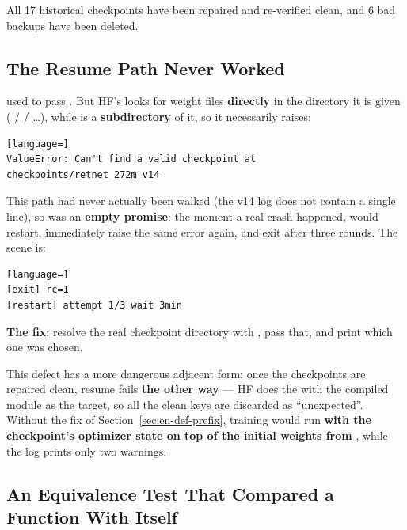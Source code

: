 All 17 historical checkpoints have been repaired and re-verified clean, and 6 bad backups have
been deleted.

\subsection{The Resume Path Never Worked}
\label{sec:en-def-resume}

 used to pass . But HF's
 looks for weight files \textbf{directly} in the
directory it is given ( /  / \dots), while
 is a \textbf{subdirectory} of it, so it necessarily raises:

\begin{lstlisting}[language=]
ValueError: Can't find a valid checkpoint at checkpoints/retnet_272m_v14
\end{lstlisting}

This path had never actually been walked (the v14 log does not contain a single
\code{[restart]} line), so  was an \textbf{empty promise}: the
moment a real crash happened,  would restart, immediately raise the same
error again, and exit after three rounds. The scene is:

\begin{lstlisting}[language=]
[exit] rc=1
[restart] attempt 1/3 wait 3min
\end{lstlisting}

\textbf{The fix}: resolve the real checkpoint directory with
, pass that, and print
which one was chosen.

\begin{notebox}
This defect has a more dangerous adjacent form: once the checkpoints are repaired clean, resume
fails \textbf{the other way} --- HF does the  with the compiled module
as the target, so all the clean keys are discarded as ``unexpected''. Without the fix of
Section~\ref{sec:en-def-prefix}, training would run \textbf{with the checkpoint's optimizer
state on top of the initial weights from }, while the log prints only two
 warnings.
\end{notebox}

\subsection{An Equivalence Test That Compared a Function With Itself}
\label{sec:en-def-equiv}

